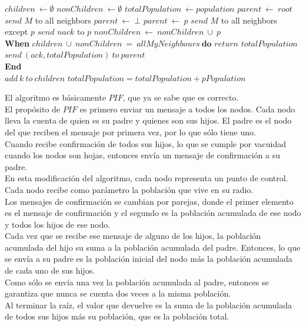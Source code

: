 \documentclass[12pt,a4paper]{report}
\begin{document}
\begin{enumerate}
{			\begin{algorithmic}[1]
					\State $children \ \leftarrow \emptyset$
					\State $nonChildren \ \leftarrow \emptyset$
					\State $totalPopulation \ \leftarrow population$
						\State $parent\ \leftarrow\ root$
						\State $send$ $M$ to all neighbors
					\Else
						\State $parent\ \leftarrow\ \bot$
					\EndIf
					\State {}
					\Start
							\State $parent\ \leftarrow\ p$
							\State $send$ $M$ to all neighbors except $p$
						\Else
							\State $send$ $nack$ to $p$
						\EndIf
					\End
					\State {}
					\Start
						\State $nonChildren\ \leftarrow\ nonChildren\ \cup\ {p}$
					\End\\
					\textbf{When} $children\ \cup\ nonChildren\ =\ allMyNeighbours
							\	\textbf{do}$
					\Start
							\State $return$ $totalPopulation$
						\Else
							\State $send\ (ack, totalPopulation)\ to\ parent$
						\EndIf\\
					\textbf{End}\\
					\Start
						\State $add\ k\ to\ children$
						\State $totalPopulation = totalPopulation + pPopulation$
					\End
					\End
				\EndFunction
			\end{algorithmic}
			El algoritmo es básicamente $PIF$, que ya se sabe que es correcto. \\
			El propósito de $PIF$ es primero enviar
			un mensaje a todos los nodos. Cada nodo lleva la cuenta de quien es su
			padre y quienes son sus hijos. El padre es el nodo del que reciben el mensaje
			por primera vez, por lo que sólo tiene uno.\\
			Cuando recibe confirmación de todos sus hijos, lo que se cumple por
			vacuidad cuando los nodos son hojas, entonces envía un mensaje de
			confirmación a su padre.\\
			En esta modificación del algoritmo, cada nodo representa un punto de control.\\
			Cada nodo recibe como parámetro la población que vive en su radio.\\
			Los mensajes de confirmación se cambian por parejas, donde el primer elemento
			es el mensaje de confirmación y el segundo es la población acumulada de
			ese nodo y todos los hijos de ese nodo.\\
			Cada vez que se recibe ese mensaje de alguno de los hijos, la
			población acumulada del hijo su suma a la población acumulada del padre.
			Entonces, lo que se envía a su padre es la población inicial del nodo más
			la población acumulada de cada uno de sus hijos.\\
			Como sólo se envía una vez la población acumulada al padre, entonces se
			garantiza que nunca se cuenta dos veces a la misma población.\\
			Al terminar la raíz, el valor que devuelve es la suma de la población
			acumulada de todos sus hijos más su población, que es la población total.\\
			}



\end{enumerate}
\end{document}
